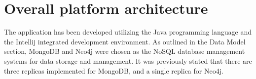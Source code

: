 \chapter{Overall platform architecture}

The application has been developed utilizing the Java programming language and the Intellij integrated development environment. As outlined in the Data Model section, MongoDB and Neo4j were chosen as the NoSQL database management systems for data storage and management. It was previously stated that there are three replicas implemented for MongoDB, and a single replica for Neo4j.